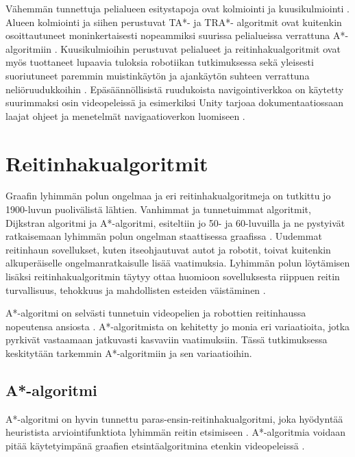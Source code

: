 \documentclass[utf8]{gradu3}
\begin{document}
Vähemmän tunnettuja pelialueen esitystapoja ovat kolmiointi ja kuusikulmiointi \parencite{abd2015comprehensive}. Alueen kolmiointi ja siihen perustuvat TA*- ja TRA*- algoritmit ovat kuitenkin osoittautuneet moninkertaisesti nopeammiksi suurissa pelialueissa verrattuna A*-algoritmiin \parencite{demyen2006efficient}. Kuusikulmioihin perustuvat pelialueet ja reitinhakualgoritmit ovat myös tuottaneet lupaavia tuloksia robotiikan tutkimuksessa sekä yleisesti suoriutuneet paremmin muistinkäytön ja ajankäytön suhteen verrattuna neliöruudukkoihin \parencite{abd2015comprehensive,lawande2022systematic}. Epäsäännöllisistä ruudukoista navigointiverkkoa on käytetty suurimmaksi osin videopeleissä ja esimerkiksi Unity tarjoaa dokumentaatiossaan laajat ohjeet ja menetelmät navigaatioverkon luomiseen \parencite{lawande2022systematic,unitydocnavmesh}.

\section{Reitinhakualgoritmit}

Graafin lyhimmän polun ongelmaa ja eri reitinhakualgoritmeja on tutkittu jo 1900-luvun puolivälistä lähtien. Vanhimmat ja tunnetuimmat algoritmit, Dijkstran algoritmi ja A*-algo\-rit\-mi, esiteltiin jo 50- ja 60-luvuilla ja ne pystyivät ratkaisemaan lyhimmän polun ongelman staattisessa graafissa \parencite{dijkstra1959note,hart1968formal}. Uudemmat reitinhaun sovellukset, kuten itseohjautuvat autot ja robotit, toivat kuitenkin alkuperäiselle ongelmanratkaisulle lisää vaatimuksia. Lyhimmän polun löytämisen lisäksi reitinhakualgoritmin täytyy ottaa huomioon sovelluksesta riippuen reitin turvallisuus, tehokkuus ja mahdollisten esteiden väistäminen \parencite{karur2021survey}.

A*-algoritmi on selvästi tunnetuin videopelien ja robottien reitinhaussa nopeutensa ansiosta \parencite{abd2015comprehensive,botea2013pathfinding,cui2011based}. A*-algoritmista on kehitetty jo monia eri variaatioita, jotka pyrkivät vastaamaan jatkuvasti kasvaviin vaatimuksiin. Tässä tutkimuksessa keskitytään tarkemmin A*-algoritmiin ja sen variaatioihin.

\subsection{A*-algoritmi}

A*-algoritmi on hyvin tunnettu paras-ensin-reitinhakualgoritmi, joka hyödyntää heuristista arviointifunktiota lyhimmän reitin etsimiseen \parencite{cui2011based,duchovn2014path}. A*-algoritmia voidaan pitää käytetyimpänä graafien etsintäalgoritmina etenkin videopeleissä \parencite{botea2013pathfinding,lawande2022systematic}.
\end{document}
